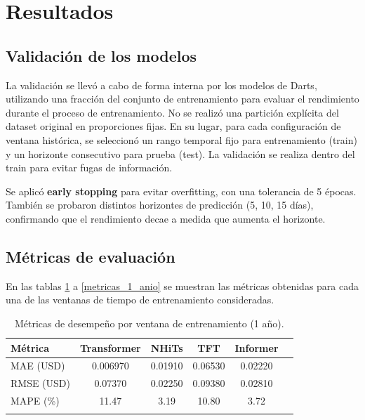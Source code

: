 \documentclass[12pt]{article}
\begin{document}

\newpage
\section{Resultados}
\label{sec:resultados}

\subsection{Validación de los modelos}

La validación se llevó a cabo de forma interna por los modelos de Darts, utilizando una fracción del
conjunto de entrenamiento para evaluar el rendimiento durante el proceso de entrenamiento.
No se realizó una partición explícita del dataset original en proporciones fijas.
En su lugar, para cada configuración de ventana histórica, se seleccionó un rango temporal
fijo para entrenamiento (train) y un horizonte consecutivo para prueba (test).
La validación se realiza dentro del train para evitar fugas de información.

Se aplicó \textbf{early stopping} para evitar overfitting, con una tolerancia de 5 épocas.
También se probaron distintos horizontes de predicción (5, 10, 15 días), confirmando que el rendimiento decae a medida que aumenta el horizonte.


\bigskip
\subsection{Métricas de evaluación}

En las tablas \ref{metricas_3_meses} a  \ref{metricas_1_anio} se muestran las métricas obtenidas para cada una de las ventanas de tiempo de entrenamiento consideradas.

\begin{table}[H]
\centering
\caption{Métricas de desempeño por ventana de entrenamiento (1 año).}
\begin{tabular}{lccccc}
\toprule
\textbf{Métrica} & \textbf{Transformer} & \textbf{NHiTs} & \textbf{TFT} & \textbf{Informer} \\
\midrule
MAE (USD)  & 0.006970 & 0.01910 & 0.06530 & 0.02220 \\
RMSE (USD) & 0.07370 & 0.02250 & 0.09380 & 0.02810 \\
MAPE (\%)  & 11.47 & 3.19 & 10.80 & 3.72 \\
\bottomrule
\label{metricas_3_meses}
\end{tabular}
\end{table}
\end{document}
